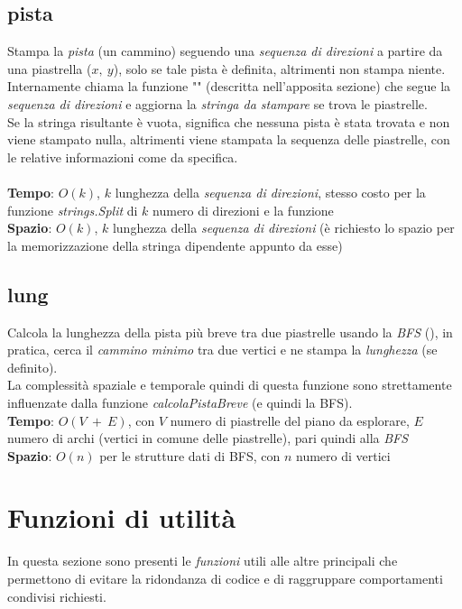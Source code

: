 \documentclass{article}
\begin{document}
\subsection{pista}
Stampa la \textit{pista} (un cammino) seguendo una \textit{sequenza di direzioni} a partire da una piastrella (\(x,\ y\)), solo se tale pista è definita, altrimenti non stampa niente.\\
Internamente chiama la funzione "" (descritta nell'apposita sezione) che segue la \textit{sequenza di direzioni} e aggiorna la \textit{stringa da stampare} se trova le piastrelle.\\
Se la stringa risultante è vuota, significa che nessuna pista è stata trovata e non viene stampato nulla, altrimenti viene stampata la sequenza delle piastrelle, con le relative informazioni come da specifica.\\
\\
\textbf{Tempo}: \(O(k)\), \(k\) lunghezza della \textit{sequenza di direzioni}, stesso costo per la funzione \textit{strings.Split} di \(k\) numero di direzioni e la funzione \\
\textbf{Spazio}: \(O(k)\), \(k\) lunghezza della \textit{sequenza di direzioni} (è richiesto lo spazio per la memorizzazione della stringa dipendente appunto da esse)

\subsection{lung}
Calcola la lunghezza della pista più breve tra due piastrelle usando la \textit{BFS} (), in pratica, cerca il \textit{cammino minimo} tra due vertici e ne stampa la \textit{lunghezza} (se definito).\\
La complessità spaziale e temporale quindi di questa funzione sono strettamente influenzate dalla funzione \textit{calcolaPistaBreve} (e quindi la BFS).\\
\textbf{Tempo}: \(O(V\ +\ E)\), con \(V\) numero di piastrelle del piano da esplorare, \(E\) numero di archi (vertici in comune delle piastrelle), pari quindi alla \textit{BFS}\\
\textbf{Spazio}: \(O(n)\) per le strutture dati di BFS, con \(n\) numero di vertici

\section{Funzioni di utilità}
In questa sezione sono presenti le \textit{funzioni} utili alle altre  principali che permettono di evitare la ridondanza di codice e di raggruppare comportamenti condivisi richiesti.\\
\end{document}
